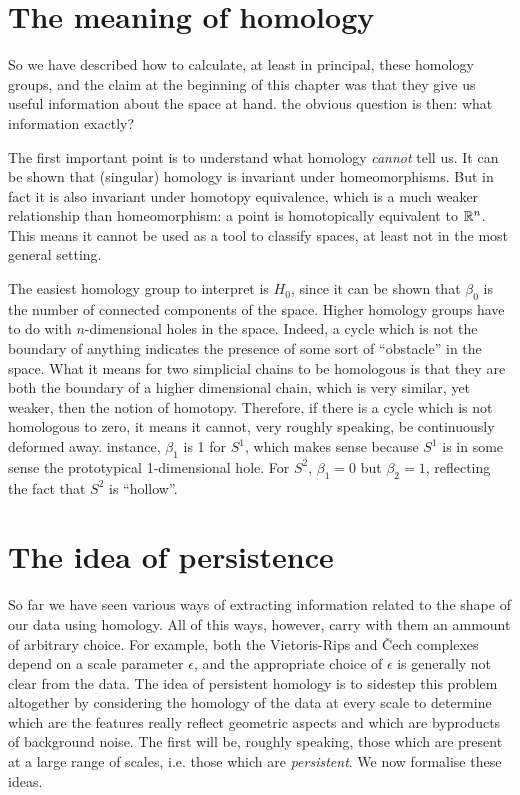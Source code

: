 \documentclass[../main.tex]{subfiles}
\begin{document}
\section{The meaning of homology}\label{sec:meaning}
So we have described how to calculate, at least in principal, these homology groups, and
the claim at the beginning of this chapter was that they give us useful information about
the space at hand. the obvious question is then: what information exactly?

The first important point is to understand what homology \emph{cannot} tell us. It can be
shown that (singular) homology is invariant under homeomorphisms. But in fact it is also
invariant under homotopy equivalence, which is a much weaker relationship than
homeomorphism: a point is homotopically equivalent to \( \mathbb{R}^n \). This means it cannot be
used as a tool to classify spaces, at least not in the most general setting. 

The easiest homology group to interpret is \( H_0 \), since it can be shown that \(
\beta_0 \) is the number of connected components of the space. Higher homology groups
have to do with \( n \)-dimensional holes in the space.  Indeed, a cycle which is not the
boundary of anything indicates the presence of some sort of ``obstacle'' in the space.
What it means for two simplicial chains to be homologous is that they are both the
boundary of a higher dimensional chain, which is very similar, yet weaker, then the notion
of homotopy. Therefore, if there is a cycle which is not homologous to zero, it means it
cannot, very roughly speaking, be continuously deformed away.  instance, \( \beta_1 \) is
1 for \( S^1 \), which makes sense because \( S^1 \) is in some sense the prototypical
1-dimensional hole. For \( S^2 \), \( \beta_1 = 0 \) but \( \beta_2 = 1 \), reflecting the
fact that \( S^2 \) is ``hollow''. 

\section{The idea of persistence}\label{sec:persistence} 
So far we have seen various ways of extracting information related to the shape of our
data using homology. All of this ways, however, carry with them an ammount of arbitrary
choice. For example, both the Vietoris-Rips and Čech complexes depend on a scale parameter
\( \epsilon \), and the appropriate choice of \( \epsilon \) is generally not clear from
the data. The idea of persistent homology is to sidestep this problem altogether by
considering the homology of the data at every scale to determine which are the features
really reflect geometric aspects and which are byproducts of background noise. The first
will be, roughly speaking, those which are present at a large range of scales, i.e. those
which are \emph{persistent}. We now formalise these ideas.
\end{document}
